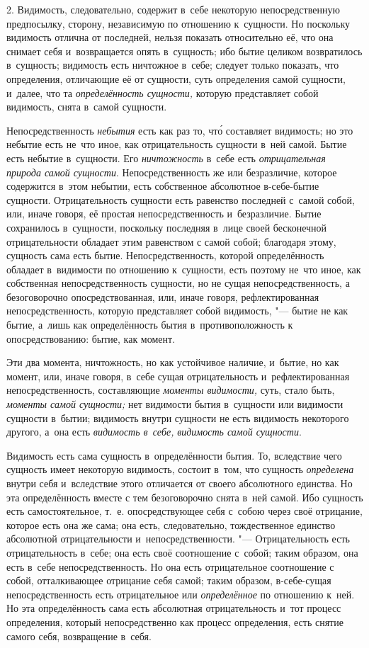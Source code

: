 2. Видимость, следовательно, содержит в~себе некоторую непосредственную
предпосылку, сторону, независимую по отношению к~сущности. Но поскольку
видимость отлична от последней, нельзя показать относительно её, что она
снимает себя и~возвращается опять в~сущность; ибо бытие целиком
возвратилось в~сущность; видимость есть ничтожное в~себе; следует только
показать, что определения, отличающие её от сущности, суть определения
самой сущности, и~далее, что та {\em определённость
сущности,} которую представляет собой видимость, снята в~самой сущности.

Непосредственность {\em небытия} есть как раз то, чт\'{о}
составляет видимость; но это небытие есть не~что иное, как отрицательность
сущности в~ней самой. Бытие есть небытие в~сущности. Его
{\em ничтожность} в~себе есть
{\em отрицательная природа самой сущности}.
Непосредственность же или безразличие, которое содержится в~этом небытии,
есть собственное абсолютное в-себе-бытие сущности. Отрицательность сущности
есть равенство последней с~самой собой, или, иначе говоря, её простая
непосредственность и~безразличие. Бытие сохранилось в~сущности, поскольку
последняя в~лице своей бесконечной отрицательности обладает этим равенством
с самой собой; благодаря этому, сущность сама есть бытие.
Непосредственность, которой определённость обладает в~видимости по
отношению к~сущности, есть поэтому не~что иное, как собственная
непосредственность сущности, но не сущая непосредственность, а
безоговорочно опосредствованная, или, иначе говоря, рефлектированная
непосредственность, которую представляет собой видимость, "--- бытие не как
бытие, а~лишь как определённость бытия в~противоположность к
опосредствованию: бытие, как момент.

Эти два момента, ничтожность, но как устойчивое наличие, и~бытие, но как
момент, или, иначе говоря, в~себе сущая отрицательность и~рефлектированная
непосредственность, составляющие {\em моменты
видимости,} суть, стало быть, {\em моменты самой
сущности;} нет видимости бытия в~сущности или видимости сущности в~бытии;
видимость внутри сущности не есть видимость некоторого другого, а~она есть
{\em видимость в~себе,}
{\em видимость самой сущности}.

Видимость есть сама сущность в~определённости бытия. То, вследствие чего
сущность имеет некоторую видимость, состоит в~том, что сущность
{\em определена} внутри себя и~вследствие этого
отличается от своего абсолютного единства. Но эта определённость вместе с
тем безоговорочно снята в~ней самой. Ибо сущность есть самостоятельное,
т.~е. опосредствующее себя с~собою через своё отрицание, которое есть она
же сама; она есть, следовательно, тождественное единство абсолютной
отрицательности и~непосредственности. "--- Отрицательность есть
отрицательность в~себе; она есть своё соотношение с~собой; таким образом,
она есть в~себе непосредственность. Но она есть отрицательное соотношение с
собой, отталкивающее отрицание себя самой; таким образом, в-себе-сущая
непосредственность есть отрицательное или
{\em определённое} по отношению к~ней. Но эта
определённость сама есть абсолютная отрицательность и~тот процесс
определения, который непосредственно как процесс определения, есть снятие
самого себя, возвращение в~себя.

